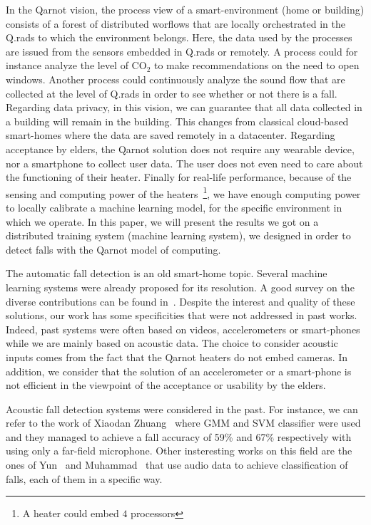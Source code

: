 \documentclass[10pt, conference, compsocconf]{IEEEtran}
\begin{document}
In the Qarnot vision, the process view of a smart-environment (home or building) consists of a forest of distributed 
worflows that are locally orchestrated in the Q.rads to which the environment belongs. Here, the data used by the processes are 
issued from the sensors embedded in Q.rads or remotely. A process could for instance analyze the level of $\mathrm{CO_2}$ to make 
recommendations on the need to open windows. Another process could continuously analyze the sound flow that are collected 
at the level of Q.rads in order to see whether or not there is a fall. 
Regarding data privacy, in this vision, we can guarantee that all data collected in a building will remain in the building. 
This changes from classical cloud-based smart-homes where the data are saved remotely in a datacenter. 
Regarding acceptance by elders, the Qarnot solution does not require any wearable device, nor a smartphone to collect user data. 
The user does not even need to care about the functioning of their heater. Finally for real-life performance, because of the sensing and 
computing power of the heaters~\footnote{ A heater could embed $4$ processors}, we have enough computing power to locally 
calibrate a machine learning model, for the specific environment in which we operate.
In this paper, we will present the results we got on a distributed training system (machine learning system), 
we designed in order to detect falls with the Qarnot model of computing. 

The automatic fall detection is an old smart-home topic. Several machine learning systems were already 
proposed for its resolution. A good survey on the diverse contributions can be found in~\cite{Igual2013,Mubashir:2013:SFD:2397722.2397898}. 
Despite the interest and quality of these solutions, our work has some specificities that were not addressed in past 
works. Indeed, past systems were often based on videos, accelerometers or smart-phones while we are mainly based on 
acoustic data. The choice to consider acoustic inputs comes from the fact that the Qarnot heaters do not embed cameras. In addition, 
we consider that the solution of an accelerometer or a smart-phone is not efficient in the viewpoint of the acceptance or 
usability by the elders. 

Acoustic fall detection systems were considered in the past. For instance, we can refer to the work of Xiaodan Zhuang~\cite{Xiaodan2009} where GMM and SVM classifier were used and they managed to achieve a fall accuracy of 59\% and 67\% respectively with using only a far-field microphone. Other insteresting works on this field are the ones of Yun~\cite{Yun2012} and Muhammad~\cite{Muhammad2014} that use audio data to achieve classification of falls, each of them in a specific way.  
\end{document}
